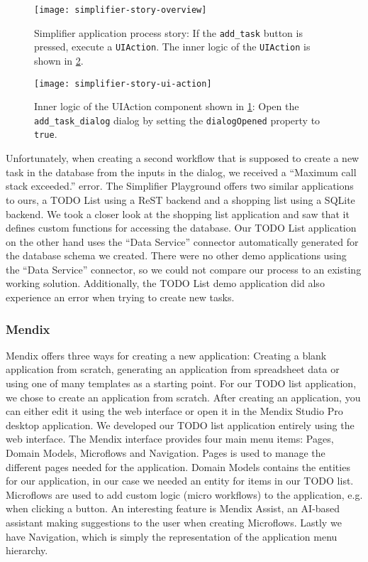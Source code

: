 \documentclass[runningheads]{llncs}
\begin{document}
\begin{figure}
  \centering
  \texttt{[image: simplifier-story-overview]}
  \caption{Simplifier application process story: If the \texttt{add\_task} button is pressed, execute a \texttt{UIAction}. The inner logic of the \texttt{UIAction} is shown in \cref{fig:simplifier_story_ui_action}.}
  \label{fig:simplifier_story_overview}
\end{figure}

\begin{figure}
  \centering
  \texttt{[image: simplifier-story-ui-action]}
  \caption{Inner logic of the UIAction component shown in \cref{fig:simplifier_story_overview}: Open the \texttt{add\_task\_dialog} dialog by setting the \texttt{dialogOpened} property to \texttt{true}.}
  \label{fig:simplifier_story_ui_action}
\end{figure}

Unfortunately, when creating a second workflow that is supposed to create a new task in the database from the inputs in the dialog, we received a “Maximum call stack exceeded.” error. The Simplifier Playground offers two similar applications to ours, a TODO List using a ReST backend and a shopping list using a SQLite backend. We took a closer look at the shopping list application and saw that it defines custom functions for accessing the database. Our TODO List application on the other hand uses the “Data Service” connector automatically generated for the database schema we created. There were no other demo applications using the “Data Service” connector, so we could not compare our process to an existing working solution. Additionally, the TODO List demo application did also experience an error when trying to create new tasks.

\subsubsection{Mendix}

Mendix offers three ways for creating a new application: Creating a blank application from scratch, generating an application from spreadsheet data or using one of many templates as a starting point. For our TODO list application, we chose to create an application from scratch. After creating an application, you can either edit it using the web interface or open it in the Mendix Studio Pro desktop application. We developed our TODO list application entirely using the web interface. The Mendix interface provides four main menu items: Pages, Domain Models, Microflows and Navigation. Pages is used to manage the different pages needed for the application. Domain Models contains the entities for our application, in our case we needed an entity for items in our TODO list. Microflows are used to add custom logic (micro workflows) to the application, e.g. when clicking a button. An interesting feature is Mendix Assist, an AI-based assistant making suggestions to the user when creating Microflows. Lastly we have Navigation, which is simply the representation of the application menu hierarchy.
\end{document}
